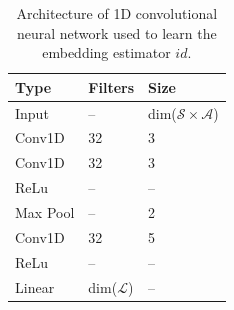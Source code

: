 \documentclass{article}
\newcommand{\cA}{\mathcal{A}}
\newcommand{\cL}{\mathcal{L}}
\newcommand{\cS}{\mathcal{S}}
\begin{document}
\begin{table}[h]
\centering
\begin{tabular}{lll}
Type     & Filters & Size \\
\hline
Input    & --           & dim($\cS \times \cA$) \\
Conv1D   & 32           & 3 \\
Conv1D   & 32           & 3 \\
ReLu     & --           & -- \\
Max Pool & --           & 2 \\
Conv1D   & 32           & 5 \\
ReLu     & --           & -- \\
Linear   & dim($\cL$)   & -- \\
\end{tabular}
\caption{Architecture of 1D convolutional neural network used to learn the embedding estimator $id$.}
\label{conv1d}
\end{table}
\end{document}
